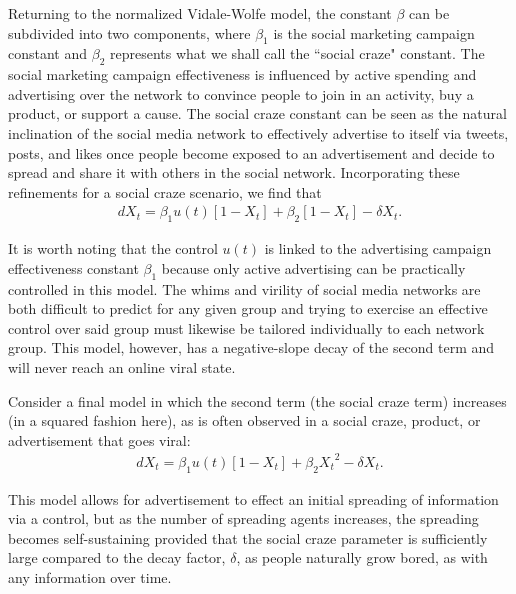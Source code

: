 Returning to the normalized Vidale-Wolfe model, the constant $\beta$ can be subdivided into two components, where $\beta_1$ is the social marketing campaign constant and $\beta_2$ represents what we shall call the ``social craze" constant. The social marketing campaign effectiveness is influenced by active spending and advertising over the network to convince people to join in an activity, buy a product, or support a cause. The social craze constant can be seen as the natural inclination of the social media network to effectively advertise to itself via tweets, posts, and likes once people become exposed to an advertisement and decide to spread and share it with others in the social network. Incorporating these refinements for a social craze scenario, we find that
\begin{equation} \label{eqn:CrazeModel2}
\left.\begin{aligned}
dX_t=\beta_1 u(t)[1-X_t] + \beta_2[1-X_t]-\delta X_t.
\end{aligned}\right.
\end{equation}

It is worth noting that the control $u(t)$ is linked to the advertising campaign effectiveness constant $\beta_1$ because only active advertising can be practically controlled in this model. The whims and virility of social media networks are both difficult to predict for any given group and trying to exercise an effective control over said group must likewise be tailored individually to each network group. This model, however, has a negative-slope decay of the second term and will never reach an online viral state.

Consider a final model in which the second term (the social craze term) increases (in a squared fashion here), as is often observed in a social craze, product, or advertisement that goes viral:
\begin{equation} \label{eqn:CrazeModel3}
\left.\begin{aligned}
dX_t=\beta_1 u(t)[1-X_t] + \beta_2 {X_{t}}^{2}-\delta X_t.
\end{aligned}\right.
\end{equation}

This model allows for advertisement to effect an initial spreading of information via a control, but as the number of spreading agents increases, the spreading becomes self-sustaining provided that the social craze parameter is sufficiently large compared to the decay factor, $\delta$, as people naturally grow bored, as with any information over time.

